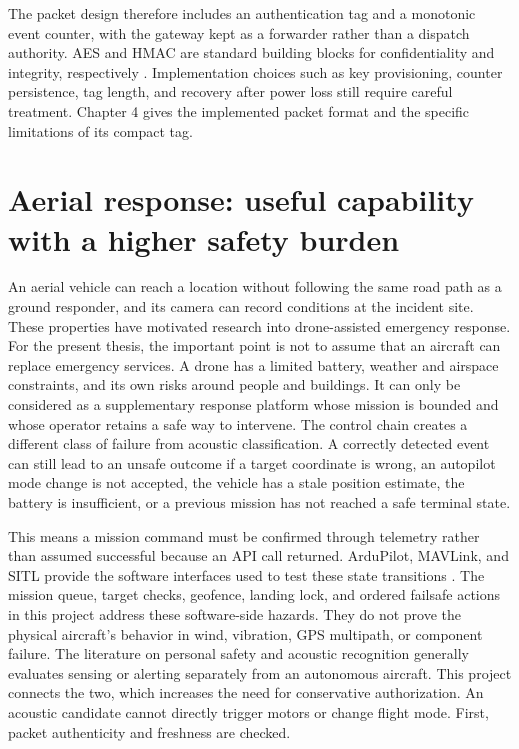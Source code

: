 \documentclass[12pt,a4paper]{report}
\begin{document}
The packet design therefore includes an authentication tag and a monotonic event counter, with the gateway kept as a forwarder rather than a dispatch authority. AES and HMAC are standard building blocks for confidentiality and integrity, respectively \cite{fips197,rfc2104}. Implementation choices such as key provisioning, counter persistence, tag length, and recovery after power loss still require careful treatment. Chapter 4 gives the implemented packet format and the specific limitations of its compact tag.

\section{Aerial response: useful capability with a higher safety burden}

An aerial vehicle can reach a location without following the same road path as a ground responder, and its camera can record conditions at the incident site. These properties have motivated research into drone-assisted emergency response. For the present thesis, the important point is not to assume that an aircraft can replace emergency services. A drone has a limited battery, weather and airspace constraints, and its own risks around people and buildings. It can only be considered as a supplementary response platform whose mission is bounded and whose operator retains a safe way to intervene. The control chain creates a different class of failure from acoustic classification. A correctly detected event can still lead to an unsafe outcome if a target coordinate is wrong, an autopilot mode change is not accepted, the vehicle has a stale position estimate, the battery is insufficient, or a previous mission has not reached a safe terminal state.

This means a mission command must be confirmed through telemetry rather than assumed successful because an API call returned. ArduPilot, MAVLink, and SITL provide the software interfaces used to test these state transitions \cite{ardupilot,dronekitsitl}. The mission queue, target checks, geofence, landing lock, and ordered failsafe actions in this project address these software-side hazards. They do not prove the physical aircraft's behavior in wind, vibration, GPS multipath, or component failure. The literature on personal safety and acoustic recognition generally evaluates sensing or alerting separately from an autonomous aircraft. This project connects the two, which increases the need for conservative authorization. An acoustic candidate cannot directly trigger motors or change flight mode. First, packet authenticity and freshness are checked.
\end{document}
